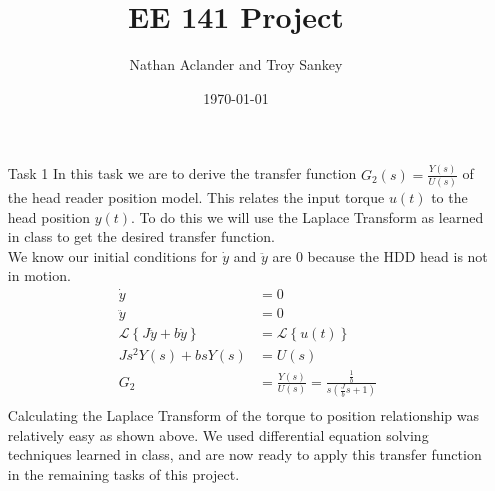 \documentclass{article}
\title{EE 141 Project}
\date{\today}
\author{Nathan Aclander and Troy Sankey}
\begin{document}
\maketitle
\newpage

\begin{itemize}

\item[Task 1] 
	In this task we are to derive the transfer function $G_2(s) = 
	\frac{Y(s)}{U(s)}$ of the head reader position model. This relates the
	input torque $u(t)$ to the head position $y(t)$. To do this we will use
	the Laplace Transform as learned in class to get the desired transfer 
	function. \\
	We know our initial conditions for $\dot{y}$ and $\ddot{y}$ are $0$ because
	the HDD head is not in motion.
	\begin{align*}
		\dot{y} &= 0 \\
		\ddot{y} &= 0 \\
		\mathcal{L}\left\{ J\ddot{y} + b \dot{y}\right\} &= \mathcal{L}\left\{
		u(t)\right\} \\
		Js^2 Y(s) + bsY(s) &= U(s) \\
		G_2 &= \frac{Y(s)}{U(s)} = \frac{\frac{1}{b}}{s(\frac{J}{b}s + 1)}  \\
	\end{align*}
	Calculating the Laplace Transform of the torque to position relationship
	was relatively easy as shown above. We used differential equation solving
	techniques learned in class, and are now ready to apply this transfer
	function in the remaining tasks of this project.


\end{itemize}
\end{document}
